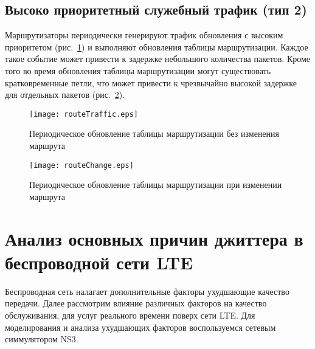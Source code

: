 \subsection{Высоко приоритетный служебный трафик (тип 2) } \label{subsect2_1_7}
Маршрутизаторы периодически генерируют трафик обновления с высоким приоритетом (рис. \ref{img:routeTraffic}) и выполняют обновления таблицы маршрутизации. Каждое такое событие может привести к задержке небольшого количества пакетов. Кроме того во время обновления таблицы маршрутизации могут существовать кратковременные петли, что может привести к чрезвычайно высокой задержке для отдельных пакетов (рис. \ref{img:routeChange}).

\begin{figure} [h]
  \center
\texttt{[image: routeTraffic.eps]}
  \caption{Периодическое обновление таблицы маршрутизации без изменения маршрута \cite{clark}}
  \label{img:routeTraffic}
\end{figure}
\begin{figure} [h]
  \center
\texttt{[image: routeChange.eps]}
  \caption{Периодическое обновление таблицы маршрутизации при изменении маршрута \cite{clark}}
  \label{img:routeChange}
\end{figure}

\section{Анализ основных причин джиттера в беспроводной сети LTE} \label{sect2_2}
Беспроводная сеть налагает дополнительные факторы ухудшающие качество передачи. Далее рассмотрим влияние различных факторов на качество обслуживания, для услуг реального времени поверх сети LTE. Для моделирования и анализа ухудшающих факторов воспользуемся сетевым симмулятором NS3.

